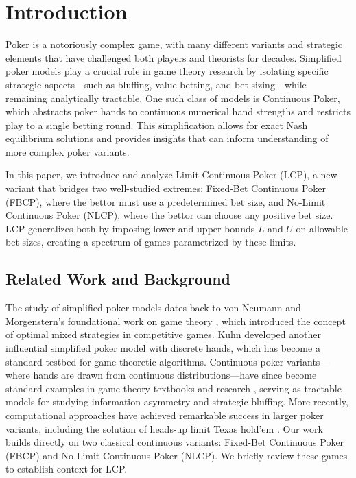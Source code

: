 \documentclass[../../main/main.tex]{subfiles}
\begin{document}
\section{Introduction}

Poker is a notoriously complex game, with many different variants and strategic elements that have challenged both players and theorists for decades. Simplified poker models play a crucial role in game theory research by isolating specific strategic aspects---such as bluffing, value betting, and bet sizing---while remaining analytically tractable. One such class of models is Continuous Poker, which abstracts poker hands to continuous numerical hand strengths and restricts play to a single betting round. This simplification allows for exact Nash equilibrium solutions and provides insights that can inform understanding of more complex poker variants.

In this paper, we introduce and analyze Limit Continuous Poker (LCP), a new variant that bridges two well-studied extremes: Fixed-Bet Continuous Poker (FBCP), where the bettor must use a predetermined bet size, and No-Limit Continuous Poker (NLCP), where the bettor can choose any positive bet size. LCP generalizes both by imposing lower and upper bounds $L$ and $U$ on allowable bet sizes, creating a spectrum of games parametrized by these limits.

\subsection{Related Work and Background}

The study of simplified poker models dates back to von Neumann and Morgenstern's foundational work on game theory \cite{vonneumann1944theory}, which introduced the concept of optimal mixed strategies in competitive games. Kuhn \cite{kuhn1950simplified} developed another influential simplified poker model with discrete hands, which has become a standard testbed for game-theoretic algorithms. Continuous poker variants---where hands are drawn from continuous distributions---have since become standard examples in game theory textbooks and research \cite{koller1997representations}, serving as tractable models for studying information asymmetry and strategic bluffing. More recently, computational approaches have achieved remarkable success in larger poker variants, including the solution of heads-up limit Texas hold'em \cite{bowling2015heads}. Our work builds directly on two classical continuous variants: Fixed-Bet Continuous Poker (FBCP) and No-Limit Continuous Poker (NLCP). We briefly review these games to establish context for LCP.
\end{document}
